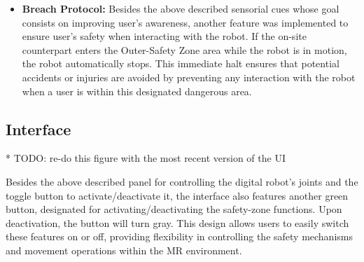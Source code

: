 \begin{itemize}
\item \textbf{Breach Protocol:} Besides the above described sensorial cues whose goal consists on improving user's awareness, another feature was implemented to ensure user's safety when interacting with the robot. If the on-site counterpart enters the Outer-Safety Zone area while the robot is in motion, the robot automatically stops. This immediate halt ensures that potential accidents or injuries are avoided by preventing any interaction with the robot when a user is within this designated dangerous area.
\end{itemize}


    
\subsection{Interface}

* TODO: re-do this figure with the most recent version of the UI

Besides the above described panel for controlling the digital robot's joints and the toggle button to activate/deactivate it, the interface also features another green button, designated for activating/deactivating the safety-zone functions. Upon deactivation, the button will turn gray. This design allows users to easily switch these features on or off, providing flexibility in controlling the safety mechanisms and movement operations within the \ac{MR} environment.




